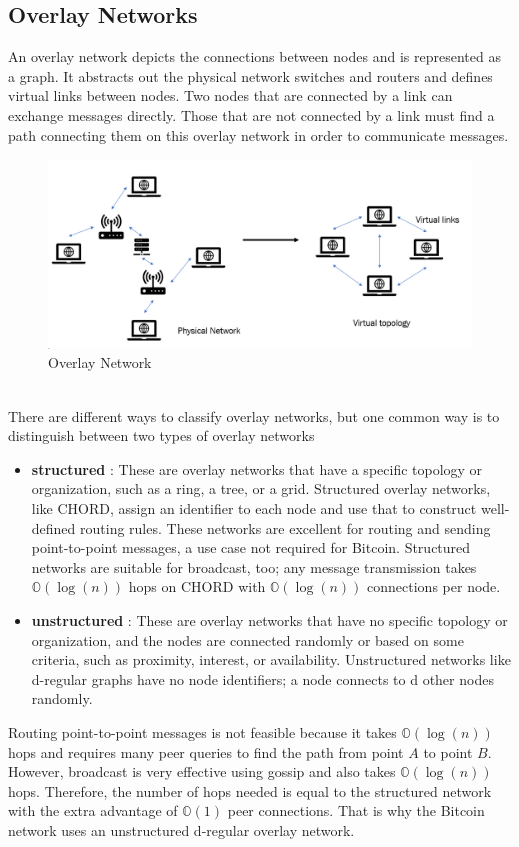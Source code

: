 \subsection{Overlay Networks}
An overlay network depicts the connections between nodes and is represented as a graph. It abstracts out the physical network switches and routers and defines virtual links between nodes. Two nodes that are connected by a link can exchange messages directly. Those that are not connected by a link must find a path connecting them on this overlay
network in order to communicate messages.
\begin{figure}[h!]
    \centering
    \includegraphics[width=0.7\linewidth]{Fig/04/F2}
    \caption{Overlay Network}
    \label{fig:f2}
\end{figure}\\
There are different ways to classify overlay networks, but one common way is to distinguish between two types of overlay networks
\begin{itemize}
    \item \textbf{structured} : These are overlay networks that have a specific topology or organization, such as a ring, a tree, or a grid. Structured overlay networks, like CHORD, assign an identifier to each node and use that to construct well-defined
    routing rules. These networks are excellent for routing and sending point-to-point messages, a use case not required for Bitcoin. Structured networks are suitable for broadcast, too; any message transmission takes $\mathbb{O}(\log(n))$ hops on CHORD with $\mathbb{O}(\log(n))$ connections per node.
    \item \textbf{unstructured} : These are overlay networks that have no specific topology or organization, and the nodes are connected randomly or based on some criteria, such as proximity, interest, or availability. Unstructured networks like d-regular graphs have no node identifiers; a node connects to d other nodes randomly.
\end{itemize}
Routing point-to-point messages is not feasible because it takes $\mathbb{O}(\log(n))$ hops and requires many peer queries to find the path from point $A$ to point $B$. However, broadcast is very effective using gossip and also takes $\mathbb{O}(\log(n))$ hops. Therefore, the number of hops needed is equal to the structured network with the extra advantage of $\mathbb{O}(1)$ peer connections. That is why the Bitcoin network uses an unstructured d-regular overlay network.
